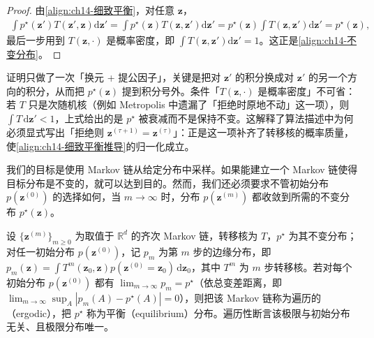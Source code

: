 \documentclass[../../main.tex]{subfiles}
\begin{document}
\begin{proof}
由\eqref{align:ch14-细致平衡}，对任意 $\bm{z}$，
\begin{align*}
\int p^{\star}\!\left(\bm{z}'\right)T\!\left(\bm{z}',\bm{z}\right)\mathrm{d}\bm{z}'=\int p^{\star}(\bm{z})T\!\left(\bm{z},\bm{z}'\right)\mathrm{d}\bm{z}'=p^{\star}(\bm{z})\int T\!\left(\bm{z},\bm{z}'\right)\mathrm{d}\bm{z}'=p^{\star}(\bm{z}),
\end{align*}
最后一步用到 $T\!\left(\bm{z},\cdot\right)$ 是概率密度，即 $\int T\!\left(\bm{z},\bm{z}'\right)\mathrm{d}\bm{z}'=1$。这正是\eqref{align:ch14-不变分布}。
\end{proof}

\begin{remark}证明只做了一次「换元 + 提公因子」，关键是把对 $\bm{z}'$ 的积分换成对 $\bm{z}'$ 的另一个方向的积分，从而把 $p^{\star}(\bm{z})$ 提到积分号外。条件「$T\!\left(\bm{z},\cdot\right)$ 是概率密度」不可省：若 $T$ 只是次随机核（例如 Metropolis 中遗漏了「拒绝时原地不动」这一项），则 $\int T\,\mathrm{d}\bm{z}'<1$，上式给出的是 $p^{\star}$ 被衰减而不是保持不变。这解释了算法描述中为何必须显式写出「拒绝则 $\bm{z}^{(\tau+1)}=\bm{z}^{(\tau)}$」：正是这一项补齐了转移核的概率质量，使\eqref{align:ch14-细致平衡推导}的归一化成立。
\end{remark}

我们的目标是使用 Markov 链从给定分布中采样。如果能建立一个 Markov 链使得目标分布是不变的，就可以达到目的。然而，我们还必须要求不管初始分布 $p\!\left(\bm{z}^{(0)}\right)$ 的选择如何，当 $m\rightarrow\infty$ 时，分布 $p\!\left(\bm{z}^{(m)}\right)$ 都收敛到所需的不变分布 $p^{\star}(\bm{z})$。

\begin{definition}[遍历性]\label{definition:ch14-遍历性}
设 $\{\bm{z}^{(m)}\}_{m\geqslant0}$ 为取值于 $\mathbb{R}^{d}$ 的齐次 Markov 链，转移核为 $T$，$p^{\star}$ 为其不变分布；对任一初始分布 $p(\bm{z}^{(0)})$，记 $p_{m}$ 为第 $m$ 步的边缘分布，即 $p_{m}(\bm{z})=\int T^{m}(\bm{z}_{0},\bm{z})p(\bm{z}^{(0)}=\bm{z}_{0})\,\mathrm{d}\bm{z}_{0}$，其中 $T^{m}$ 为 $m$ 步转移核。若对每个初始分布 $p(\bm{z}^{(0)})$ 都有 $\lim_{m\to\infty}p_{m}=p^{\star}$（依总变差距离，即 $\lim_{m\to\infty}\sup_{A}\left|p_{m}(A)-p^{\star}(A)\right|=0$），则把该 Markov 链称为遍历的（ergodic），把 $p^{\star}$ 称为平衡（equilibrium）分布。遍历性断言该极限与初始分布无关、且极限分布唯一。
\end{definition}
\end{document}
